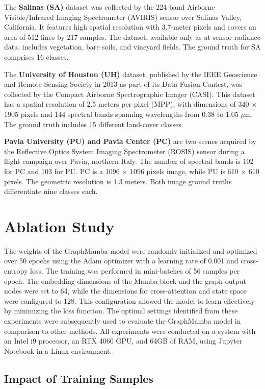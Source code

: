 \documentclass[journal]{IEEEtran}
\begin{document}
The \textbf{Salinas (SA)} dataset was collected by the 224-band Airborne Visible/Infrared Imaging Spectrometer (AVIRIS) sensor over Salinas Valley, California. It features high spatial resolution with 3.7-meter pixels and covers an area of 512 lines by 217 samples. The dataset, available only as at-sensor radiance data, includes vegetation, bare soils, and vineyard fields. The ground truth for SA comprises 16 classes.

The \textbf{University of Houston (UH)} dataset, published by the IEEE Geoscience and Remote Sensing Society in 2013 as part of its Data Fusion Contest, was collected by the Compact Airborne Spectrographic Imager (CASI). This dataset has a spatial resolution of 2.5 meters per pixel (MPP), with dimensions of 340 $\times$ 1905 pixels and 144 spectral bands spanning wavelengths from 0.38 to 1.05 $\mu$m. The ground truth includes 15 different land-cover classes.

\textbf{Pavia University (PU) and Pavia Center (PC)} are two scenes acquired by the Reflective Optics System Imaging Spectrometer (ROSIS) sensor during a flight campaign over Pavia, northern Italy. The number of spectral bands is 102 for PC and 103 for PU. PC is a 1096 $\times$ 1096 pixels image, while PU is 610 × 610 pixels. The geometric resolution is 1.3 meters. Both image ground truths differentiate nine classes each. 

\section{Ablation Study}
\label{Training}
The weights of the GraphMamba model were randomly initialized and optimized over 50 epochs using the Adam optimizer with a learning rate of 0.001 and cross-entropy loss. The training was performed in mini-batches of 56 samples per epoch. The embedding dimensions of the Mamba block and the graph output nodes were set to 64, while the dimensions for cross-attention and state space were configured to 128. This configuration allowed the model to learn effectively by minimizing the loss function. The optimal settings identified from these experiments were subsequently used to evaluate the GraphMamba model in comparison to other methods. All experiments were conducted on a system with an Intel i9 processor, an RTX 4060 GPU, and 64GB of RAM, using Jupyter Notebook in a Linux environment.

\subsection{Impact of Training Samples}
\end{document}

